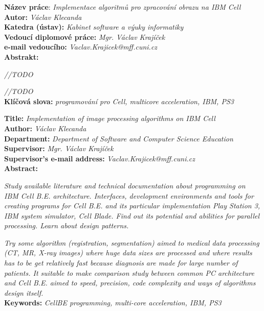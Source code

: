 \raggedbottom


\noindent
\textbf{Název práce}: \textit{Implementace algoritmů pro zpracování obrazu na IBM Cell} \\
\textbf{Autor:} \textit{Václav Klecanda} \\
\textbf{Katedra (ústav):} \textit{Kabinet software a výuky informatiky} \\
\textbf{Vedoucí diplomové práce:} \textit{Mgr. Václav Krajíček} \\
\textbf{e-mail vedoucího:} \textit{Vaclav.Krajicek@mff.cuni.cz} \\
\textbf{Abstrakt:} \\

\par
\textit{
//TODO
}

\par
\textit{
//TODO
}\\

\noindent
\textbf{Klíčová slova:} \textit{programování pro Cell, multicore acceleration, IBM, PS3} \\

\pagebreak


\noindent
\textbf{Title:} \textit{Implementation of image processing algorithms on IBM Cell} \\
\textbf{Author:} \textit{Václav Klecanda} \\
\textbf{Department:} \textit{Department of Software and Computer Science Education} \\
\textbf{Supervisor:} \textit{Mgr. Václav Krajíček} \\
\textbf{Supervisor's e-mail address:} \textit{Vaclav.Krajicek@mff.cuni.cz} \\
\textbf{Abstract:} \\

\par
\textit{
Study available literature and technical documentation about programming on IBM Cell B.E. architecture.
Interfaces, development environments and tools for creating programs for Cell B.E. and its particular implementation Play Station 3, IBM system simulator, Cell Blade.
Find out its potential and abilities for parallel processing. Learn about design patterns.
}

\par
\textit{
Try some algorithm (registration, segmentation) aimed to medical data processing (CT, MR, X-ray images) where huge data sizes are processed and where results has to be get relatively fast because diagnosis are made for large number of patients.
It suitable to make comparison study between common PC architecture and Cell B.E. aimed to speed, precision, code complexity and ways of algorithms design itself.
}\\

\noindent
\textbf{Keywords:} \textit{CellBE programming, multi-core acceleration, IBM, PS3} \\

\pagebreak